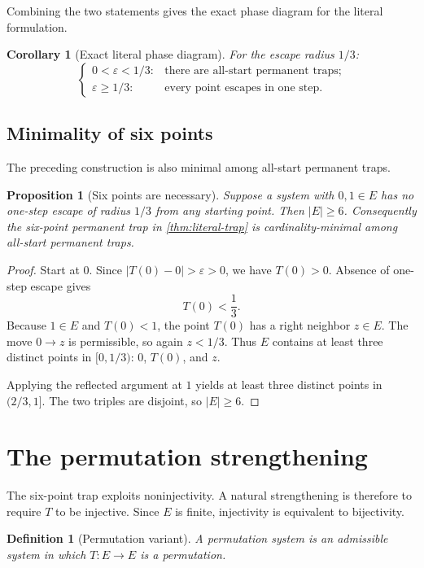 \documentclass[11pt]{article}
\newtheorem{proposition}[theorem]{Proposition}
\newtheorem{corollary}[theorem]{Corollary}
\newtheorem{definition}[theorem]{Definition}
\newcommand{\eps}{\varepsilon}
\begin{document}
Combining the two statements gives the exact phase diagram for the literal formulation.

\begin{corollary}[Exact literal phase diagram]\label{cor:literal-phase}
For the escape radius $1/3$:
\[
\begin{cases}
0<\eps<1/3:&\text{there are all-start permanent traps};\\
\eps\ge1/3:&\text{every point escapes in one step}.
\end{cases}
\]
\end{corollary}

\subsection{Minimality of six points}

The preceding construction is also minimal among all-start permanent traps.

\begin{proposition}[Six points are necessary]\label{prop:six-minimal}
Suppose a system with $0,1\in E$ has no one-step escape of radius $1/3$ from any starting point. Then $|E|\ge6$. Consequently the six-point permanent trap in \cref{thm:literal-trap} is cardinality-minimal among all-start permanent traps.
\end{proposition}

\begin{proof}
Start at $0$. Since $|T(0)-0|>\eps>0$, we have $T(0)>0$. Absence of one-step escape gives
\[
T(0)<\frac13.
\]
Because $1\in E$ and $T(0)<1$, the point $T(0)$ has a right neighbor $z\in E$. The move $0\to z$ is permissible, so again $z<1/3$. Thus $E$ contains at least three distinct points in $[0,1/3)$: $0$, $T(0)$, and $z$.

Applying the reflected argument at $1$ yields at least three distinct points in $(2/3,1]$. The two triples are disjoint, so $|E|\ge6$.
\end{proof}

\section{The permutation strengthening}

The six-point trap exploits noninjectivity. A natural strengthening is therefore to require $T$ to be injective. Since $E$ is finite, injectivity is equivalent to bijectivity.

\begin{definition}[Permutation variant]
A permutation system is an admissible system in which $T:E\to E$ is a permutation.
\end{definition}
\end{document}
